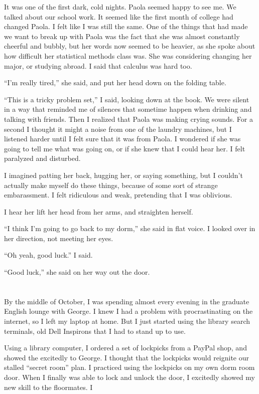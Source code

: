It was one of the first dark, cold nights.  Paola seemed happy to see me.  We
talked about our school work.  It seemed like the first month of college had
changed Paola.  I felt like I was still the same.  One of the things that had
made we want to break up with Paola was the fact that she was almost constantly
cheerful and bubbly, but her words now seemed to be heavier, as she spoke about
how difficult her statistical methods class was.  She was considering changing
her major, or studying abroad.  I said that calculus was hard too. 

``I'm really tired,'' she said, and put her head down on the folding table.

``This is a tricky problem set,'' I said, looking down at the book.  We were
silent in a way that reminded me of silences that sometime happen when drinking
and talking with friends. Then I realized that Paola was making crying sounds.
For a second I thought it might a noise from one of the laundry machines, but I
listened harder until I felt sure that it was from Paola.  I wondered if she
was going to tell me what was going on, or if she knew that I could hear her.
I felt paralyzed and disturbed.  

I imagined patting her back, hugging her, or saying something, but I couldn't
actually make myself do these things, because of some sort of strange
embarassment.  I felt ridiculous and weak, pretending that I was oblivious.

I hear her lift her head from her arms, and straighten herself.

``I think I'm going to go back to my dorm,'' she said in flat voice.  I looked
over in her direction, not meeting her eyes.   

``Oh yeah, good luck.'' I said.

``Good luck,'' she said on her way out the door.


\section{}

By the middle of October, I was spending almost every evening in the graduate
English lounge with George.  I knew I had a problem with procrastinating on the
internet, so I left my laptop at home.  But I just started using the library
search terminals, old Dell Inspirons that I had to stand up to use.  

Using a library computer, I ordered a set of lockpicks from a PayPal shop, and
showed the excitedly to George.  I thought that the lockpicks would reignite our
stalled ``secret room'' plan.  I practiced using the lockpicks on my own dorm
room door.  When I finally was able to lock and unlock the door, I excitedly
showed my new skill to the floormates.  I 

